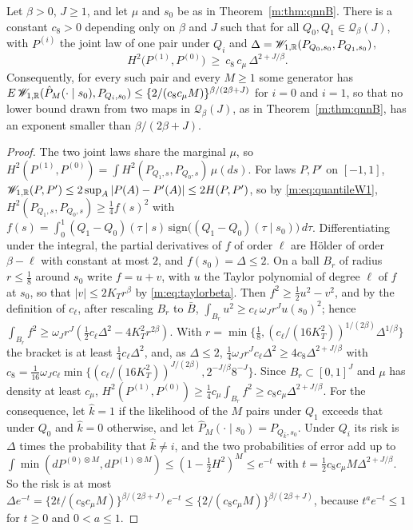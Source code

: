 \begin{proposition}\label{m:prop:qnntwo}
Let $\beta>0$, $J\ge1$, and let $\mu$ and $s_0$ be as in Theorem~\ref{m:thm:qnnB}. There is a constant $c_8>0$ depending only on $\beta$ and $J$ such that for all $Q_0,Q_1\in\mathcal Q_\beta(J)$, with $P^{(i)}$ the joint law of one pair under $Q_i$ and $\Delta=\mathscr{W}_{1,\mathbb{R}}(P_{Q_0,s_0},P_{Q_1,s_0})$,
\[
H^2\big(P^{(1)},P^{(0)}\big)\ \ge\ c_8\,c_\mu\,\Delta^{2+J/\beta} .
\]
Consequently, for every such pair and every $M\ge1$ some generator has $E\,\mathscr{W}_{1,\mathbb{R}}(\hat P_M(\cdot\mid s_0),P_{Q_i,s_0})\le\{2/(c_8c_\mu M)\}^{\beta/(2\beta+J)}$ for $i=0$ and $i=1$, so that no lower bound drawn from two maps in $\mathcal Q_\beta(J)$, as in Theorem~\ref{m:thm:qnnB}, has an exponent smaller than $\beta/(2\beta+J)$.
\end{proposition}

\begin{proof}
The two joint laws share the marginal $\mu$, so $H^2(P^{(1)},P^{(0)})=\int H^2(P_{Q_1,s},P_{Q_0,s})\,\mu(ds)$. For laws $P,P'$ on $[-1,1]$, $\mathscr{W}_{1,\mathbb{R}}(P,P')\le2\sup_A|P(A)-P'(A)|\le2H(P,P')$, so by \eqref{m:eq:quantileW1}, $H^2(P_{Q_1,s},P_{Q_0,s})\ge\frac14f(s)^2$ with $f(s)=\int_0^1(Q_1-Q_0)(\tau\mid s)\,\mathrm{sign}\big((Q_1-Q_0)(\tau\mid s_0)\big)\,d\tau$. Differentiating under the integral, the partial derivatives of $f$ of order $\ell$ are H\"older of order $\beta-\ell$ with constant at most $2$, and $f(s_0)=\Delta\le2$. On a ball $B_r$ of radius $r\le\frac18$ around $s_0$ write $f=u+v$, with $u$ the Taylor polynomial of degree $\ell$ of $f$ at $s_0$, so that $|v|\le2K_Tr^\beta$ by \eqref{m:eq:taylorbeta}. Then $f^2\ge\frac12u^2-v^2$, and by the definition of $c_\ell$, after rescaling $B_r$ to $\bar B$, $\int_{B_r}u^2\ge c_\ell\,\omega_Jr^Ju(s_0)^2$; hence $\int_{B_r}f^2\ge\omega_Jr^J(\frac12c_\ell\Delta^2-4K_T^2r^{2\beta})$. With $r=\min\{\frac18,(c_\ell/(16K_T^2))^{1/(2\beta)}\Delta^{1/\beta}\}$ the bracket is at least $\frac14c_\ell\Delta^2$, and, as $\Delta\le2$, $\frac14\omega_Jr^Jc_\ell\Delta^2\ge4c_8\Delta^{2+J/\beta}$ with $c_8=\frac1{16}\omega_Jc_\ell\min\{(c_\ell/(16K_T^2))^{J/(2\beta)},2^{-J/\beta}8^{-J}\}$. Since $B_r\subset[0,1]^J$ and $\mu$ has density at least $c_\mu$, $H^2(P^{(1)},P^{(0)})\ge\frac14c_\mu\int_{B_r}f^2\ge c_8c_\mu\Delta^{2+J/\beta}$. For the consequence, let $\hat k=1$ if the likelihood of the $M$ pairs under $Q_1$ exceeds that under $Q_0$ and $\hat k=0$ otherwise, and let $\hat P_M(\cdot\mid s_0)=P_{Q_{\hat k},s_0}$. Under $Q_i$ its risk is $\Delta$ times the probability that $\hat k\ne i$, and the two probabilities of error add up to $\int\min(dP^{(0)\otimes M},dP^{(1)\otimes M})\le(1-\frac12H^2)^M\le e^{-t}$ with $t=\frac12c_8c_\mu M\Delta^{2+J/\beta}$. So the risk is at most $\Delta e^{-t}=\{2t/(c_8c_\mu M)\}^{\beta/(2\beta+J)}e^{-t}\le\{2/(c_8c_\mu M)\}^{\beta/(2\beta+J)}$, because $t^ae^{-t}\le1$ for $t\ge0$ and $0<a\le1$.
\end{proof}

